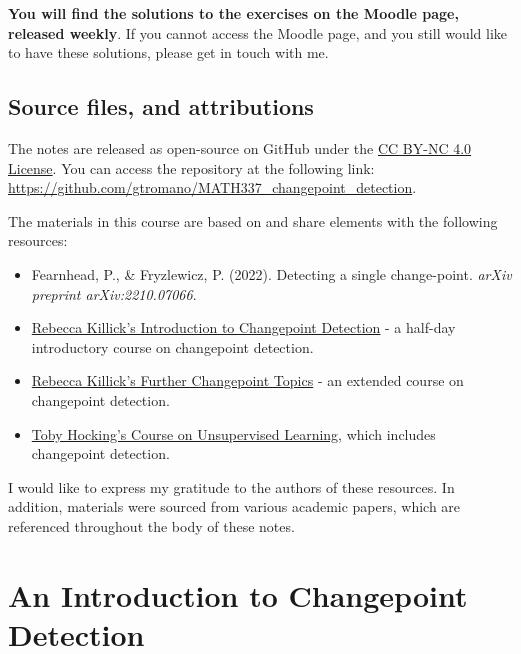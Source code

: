 \documentclass[
  letterpaper,
  DIV=11,
  numbers=noendperiod]{scrreprt}
\providecommand{\tightlist}{%
  \setlength{\itemsep}{0pt}\setlength{\parskip}{0pt}}\usepackage{longtable,booktabs,array}
\begin{document}
\textbf{You will find the solutions to the exercises on the Moodle page,
released weekly}. If you cannot access the Moodle page, and you still
would like to have these solutions, please get in touch with me.

\section*{Source files, and
attributions}\label{source-files-and-attributions}


The notes are released as open-source on GitHub under the
\href{https://github.com/gtromano/MATH337_changepoint_detection?tab=License-1-ov-file}{CC
BY-NC 4.0 License}. You can access the repository at the following link:
\url{https://github.com/gtromano/MATH337_changepoint_detection}.

The materials in this course are based on and share elements with the
following resources:

\begin{itemize}
\tightlist
\item
  Fearnhead, P., \& Fryzlewicz, P. (2022). Detecting a single
  change-point. \emph{arXiv preprint arXiv:2210.07066}.
\item
  \href{https://github.com/rkillick/intro-changepoint-course}{Rebecca
  Killick's Introduction to Changepoint Detection} - a half-day
  introductory course on changepoint detection.
\item
  \href{https://github.com/rkillick/further-changepoints-course}{Rebecca
  Killick's Further Changepoint Topics} - an extended course on
  changepoint detection.
\item
  \href{https://github.com/tdhock/2023-08-unsupervised-learning}{Toby
  Hocking's Course on Unsupervised Learning}, which includes changepoint
  detection.
\end{itemize}

I would like to express my gratitude to the authors of these resources.
In addition, materials were sourced from various academic papers, which
are referenced throughout the body of these notes.


\chapter{An Introduction to Changepoint
Detection}\label{an-introduction-to-changepoint-detection}
\end{document}
